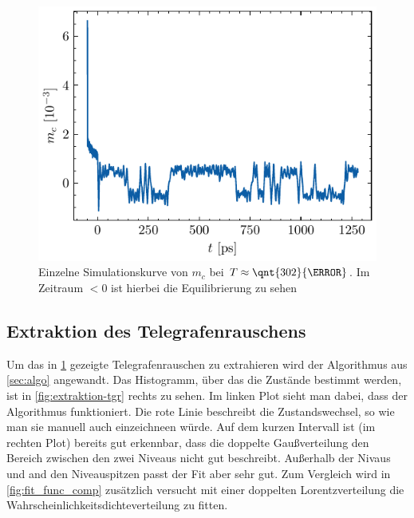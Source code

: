 \documentclass[main.tex]{subfiles}
\begin{document}
\begin{figure}[h]
    \centering
    \includegraphics{bilder/plots/theo-vis/example-telegraph-sim.pdf}
    \caption[Einzelne Simulationskurve von \(m_c\) bei \(T \approx \qnt{302}{\kelvin}\)]{Einzelne Simulationskurve von \(m_c\) bei \(T \approx \qnt{302}{\kelvin}\). Im Zeitraum \(<0\) ist hierbei die Equilibrierung zu sehen
    }\label{fig:bsp-run}
\end{figure}

\subsection{Extraktion des Telegrafenrauschens}

Um das in \cref{fig:bsp-run} gezeigte Telegrafenrauschen zu extrahieren wird der Algorithmus aus \cref{sec:algo} angewandt.
Das Histogramm, über das die Zustände bestimmt werden, ist in \cref{fig:extraktion-tgr} rechts zu sehen. Im linken Plot sieht man dabei, dass der Algorithmus funktioniert. Die rote Linie beschreibt die Zustandswechsel, so wie man sie manuell auch einzeichneen würde.  Auf dem kurzen Intervall ist (im rechten Plot) bereits gut erkennbar, dass die doppelte Gaußverteilung den Bereich zwischen den zwei Niveaus nicht gut beschreibt. Außerhalb der Nivaus und and den Niveauspitzen passt der Fit aber sehr gut. Zum Vergleich wird in \cref{fig:fit_func_comp} zusätzlich versucht mit einer doppelten Lorentzverteilung die Wahrscheinlichkeitsdichteverteilung zu fitten.
\end{document}
